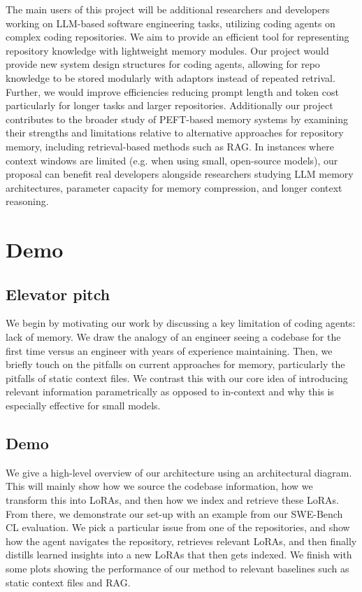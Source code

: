 \documentclass{article}
\begin{document}
The main users of this project will be additional researchers and developers working on LLM-based software engineering tasks, utilizing coding agents on complex coding repositories. We aim to provide an efficient tool for representing repository knowledge with lightweight memory modules. Our project would provide new system design structures for coding agents, allowing for repo knowledge to be stored modularly with adaptors instead of repeated retrival. Further, we would improve efficiencies reducing prompt length and token cost particularly for longer tasks and larger repositories. Additionally our project contributes to the broader study of PEFT-based memory systems by examining their strengths and limitations relative to alternative approaches for repository memory, including retrieval-based methods such as RAG. In instances where context windows are limited (e.g. when using small, open-source models), our proposal can benefit real developers alongside researchers studying LLM memory architectures, parameter capacity for memory compression, and longer context reasoning. 

\section{Demo}

\subsection{Elevator pitch}

We begin by motivating our work by discussing a key limitation of coding agents: lack of memory. We draw the analogy of an engineer seeing a codebase for the first time versus an engineer with years of experience maintaining. Then, we briefly touch on the pitfalls on current approaches for memory, particularly the pitfalls of static context files. We contrast this with our core idea of introducing relevant information parametrically as opposed to in-context and why this is especially effective for small models.

\subsection{Demo}

We give a high-level overview of our architecture using an architectural diagram. This will mainly show how we source the codebase information, how we transform this into LoRAs, and then how we index and retrieve these LoRAs. From there, we demonstrate our set-up with an example from our SWE-Bench CL evaluation. We pick a particular issue from one of the repositories, and show how the agent navigates the repository, retrieves relevant LoRAs, and then finally distills learned insights into a new LoRAs that then gets indexed. We finish with some plots showing the performance of our method to relevant baselines such as static context files and RAG.
\end{document}
